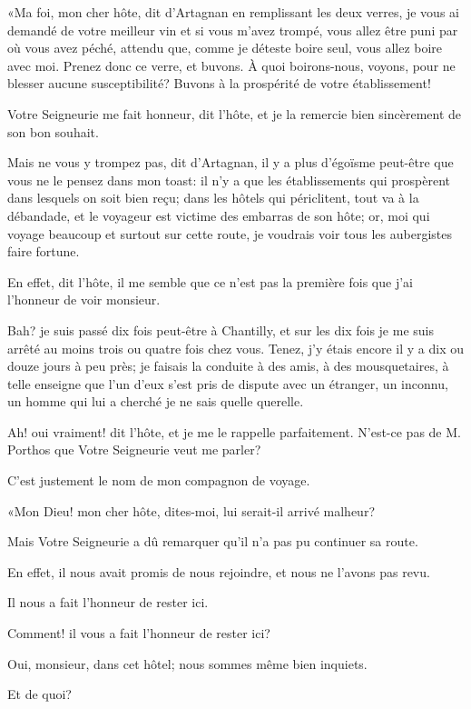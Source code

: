 «Ma foi, mon cher hôte, dit d'Artagnan en remplissant les deux verres, je vous ai demandé de votre meilleur vin et si vous m'avez trompé, vous allez être puni par où vous avez péché, attendu que, comme je déteste boire seul, vous allez boire avec moi. Prenez donc ce verre, et buvons. À quoi boirons-nous, voyons, pour ne blesser aucune susceptibilité? Buvons à la prospérité de votre établissement! 

\speak  Votre Seigneurie me fait honneur, dit l'hôte, et je la remercie bien sincèrement de son bon souhait. 

\speak  Mais ne vous y trompez pas, dit d'Artagnan, il y a plus d'égoïsme peut-être que vous ne le pensez dans mon toast: il n'y a que les établissements qui prospèrent dans lesquels on soit bien reçu; dans les hôtels qui périclitent, tout va à la débandade, et le voyageur est victime des embarras de son hôte; or, moi qui voyage beaucoup et surtout sur cette route, je voudrais voir tous les aubergistes faire fortune. 

\speak  En effet, dit l'hôte, il me semble que ce n'est pas la première fois que j'ai l'honneur de voir monsieur. 

\speak  Bah? je suis passé dix fois peut-être à Chantilly, et sur les dix fois je me suis arrêté au moins trois ou quatre fois chez vous. Tenez, j'y étais encore il y a dix ou douze jours à peu près; je faisais la conduite à des amis, à des mousquetaires, à telle enseigne que l'un d'eux s'est pris de dispute avec un étranger, un inconnu, un homme qui lui a cherché je ne sais quelle querelle. 

\speak  Ah! oui vraiment! dit l'hôte, et je me le rappelle parfaitement. N'est-ce pas de M. Porthos que Votre Seigneurie veut me parler? 

\speak  C'est justement le nom de mon compagnon de voyage. 

«Mon Dieu! mon cher hôte, dites-moi, lui serait-il arrivé malheur? 

\speak  Mais Votre Seigneurie a dû remarquer qu'il n'a pas pu continuer sa route. 

\speak  En effet, il nous avait promis de nous rejoindre, et nous ne l'avons pas revu. 

\speak  Il nous a fait l'honneur de rester ici. 

\speak  Comment! il vous a fait l'honneur de rester ici? 

\speak  Oui, monsieur, dans cet hôtel; nous sommes même bien inquiets. 

\speak  Et de quoi? 

